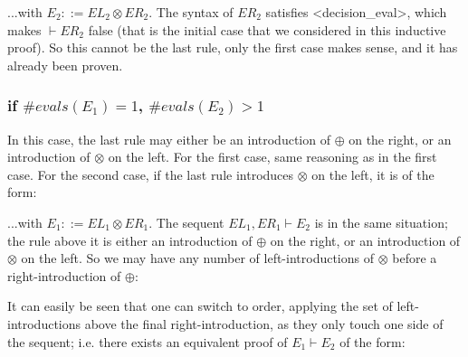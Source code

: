 \documentclass[a4paper,12pt,twoside]{article}
\begin{document}


...with $E_2 ::= EL_2 \otimes ER_2$. The syntax of $ER_2$ satisfies
<decision\_eval>, which makes $\vdash ER_2$ false (that is the initial
case that we considered in this inductive proof). So this cannot be
the last rule, only the first case makes sense, and it has already
been proven.


\subsubsection{if $\#evals(E_1) = 1$, $\#evals(E_2) > 1$}

In this case, the last rule may either be an introduction of $\oplus$ on the
right, or an introduction of $\otimes$ on the left. For the first case, same
reasoning as in the first case. For the second case, if the last rule
introduces $\otimes$ on the left, it is of the form:



...with $E_1 ::= EL_1 \otimes ER_1$. The sequent $EL_1, ER_1 \vdash E_2$ is
in the same situation; the rule above it is either an introduction of
$\oplus$ on the right, or an introduction of $\otimes$ on the left. So
we may have any number of left-introductions of $\otimes$ before a
right-introduction of $\oplus$:



It can easily be seen that one can switch to order, applying the set of
left-introductions above the final right-introduction, as
they only touch one side of the sequent; i.e. there exists an equivalent
proof of $E_1 \vdash E_2$ of the form:

\end{document}
